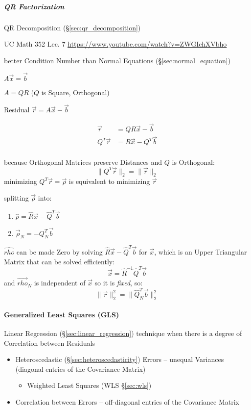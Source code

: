 \subparagraph{QR Factorization}\label{sec:qr_factorization}\hfill

QR Decomposition (\S\ref{sec:qr_decomposition})

UC Math 352 Lec. 7 \url{https://www.youtube.com/watch?v=ZWGIchXVbho}

better Condition Number than Normal Equations (\S\ref{sec:normal_equation})

$A\vec{x} = \vec{b}$

$A = QR$ ($Q$ is Square, Orthogonal)

Residual $\vec{r} = A\vec{x} - \vec{b}$

\begin{align*}
     \vec{r} & = QR\vec{x} - \vec{b} \\
  Q^T\vec{r} & = R\vec{x} - Q^T\vec{b} \\
\end{align*}

because Orthogonal Matrices preserve Distances and $Q$ is Orthogonal:
\[
  \|Q^T\vec{r}\|_2 = \|\vec{r}\|_2
\]
minimizing $Q^T\vec{r} = \vec{\rho}$ is equivalent to minimizing $\vec{r}$

splitting $\vec{\rho}$ into:
\begin{enumerate}
  \item $\hat{\rho}   = \hat{R}\vec{x} - \hat{Q}^T\vec{b}$
  \item $\vec{\rho}_N = -Q_N^T\vec{b}$
\end{enumerate}
$\hat{rho}$ can be made Zero by solving $\hat{R}\vec{x} - \hat{Q}^T\vec{b}$ for
$\vec{x}$, which is an Upper Triangular Matrix that can be solved efficiently:
\[
  \hat{\vec{x}} = \hat{R}^{-1}\hat{Q}^T\vec{b}
\]
and $\vec{rho}_N$ is independent of $\vec{x}$ so it is \emph{fixed}, so:
\[
  \|\vec{r}\|^2_2 = \|\hat{Q}_N^T\vec{b}\|_2^2
\]



\paragraph{Generalized Least Squares (GLS)}\label{sec:gls}\hfill

Linear Regression (\S\ref{sec:linear_regression}) technique when there is a
degree of Correlation between Residuals

\begin{itemize}
  \item Heteroscedastic (\S\ref{sec:heteroscedasticity}) Errors -- unequal
    Variances (diagonal entries of the Covariance Matrix)
    \begin{itemize}
      \item Weighted Least Squares (WLS \S\ref{sec:wls})
    \end{itemize}
  \item Correlation between Errors -- off-diagonal entries of the Covariance
    Matrix
\end{itemize}


